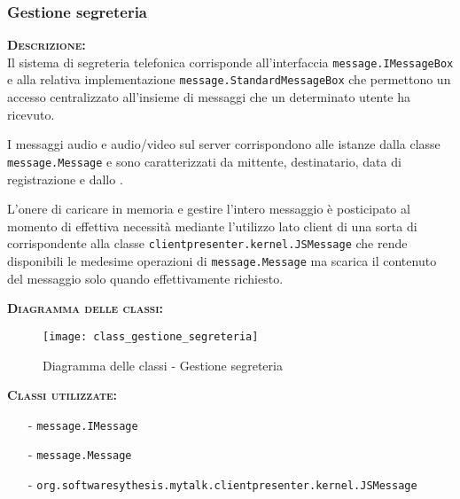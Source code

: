 \subsubsection{Gestione segreteria}
\begin{description}
	\item{\scshape\bfseries Descrizione:}\\
Il sistema di segreteria telefonica corrisponde all'interfaccia \texttt{message.IMessageBox} e alla relativa implementazione \texttt{message.StandardMessageBox} che permettono un accesso centralizzato all'insieme di messaggi che un determinato utente ha ricevuto.

I messaggi audio e audio/video sul server corrispondono alle istanze dalla classe \texttt{message.Message} e sono caratterizzati da mittente, destinatario, data di registrazione e dallo .

L'onere di caricare in memoria e gestire l'intero messaggio è posticipato al momento di effettiva necessità mediante l'utilizzo lato client di una sorta di  corrispondente alla classe \texttt{clientpresenter.kernel.JSMessage} che rende disponibili le medesime operazioni di \texttt{message.Message} ma scarica il contenuto del messaggio solo quando effettivamente richiesto.
	\item{\scshape\bfseries Diagramma delle classi:}
\begin{figure}[H]
  \centering
  \texttt{[image: class\_gestione\_segreteria]}
  \caption{Diagramma delle classi - Gestione segreteria}\label{fig:gestione_segreteria}
\end{figure}	
	
	\item{\scshape\bfseries Classi utilizzate:}
	\begin{itemize}[noitemsep,nolistsep]
		\item[-] \texttt{message.IMessage}
	  \item[-] \texttt{message.Message}
	  \item[-] \texttt{org.softwaresythesis.mytalk.clientpresenter.kernel.JSMessage}
	\end{itemize}
\end{description}

